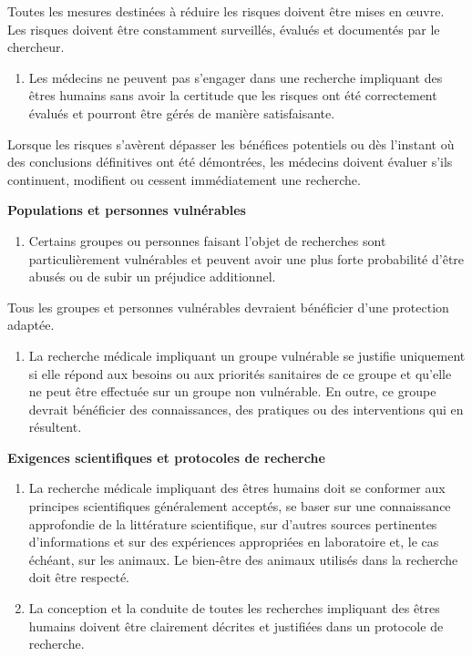 \documentclass[
  12pt,
]{book}
\providecommand{\tightlist}{%
  \setlength{\itemsep}{0pt}\setlength{\parskip}{0pt}}
\begin{document}
Toutes les mesures destinées à réduire les risques doivent être mises en œuvre. Les risques doivent être constamment surveillés, évalués et documentés par le chercheur.

\begin{enumerate}
\def\labelenumi{\arabic{enumi}.}
\setcounter{enumi}{17}
\tightlist
\item
  Les médecins ne peuvent pas s'engager dans une recherche impliquant des êtres humains sans avoir la certitude que les risques ont été correctement évalués et pourront être gérés de manière satisfaisante.
\end{enumerate}

Lorsque les risques s'avèrent dépasser les bénéfices potentiels ou dès l'instant où des conclusions définitives ont été démontrées, les médecins doivent évaluer s'ils continuent, modifient ou cessent immédiatement une recherche.

\textbf{Populations et personnes vulnérables}

\begin{enumerate}
\def\labelenumi{\arabic{enumi}.}
\setcounter{enumi}{18}
\tightlist
\item
  Certains groupes ou personnes faisant l'objet de recherches sont particulièrement vulnérables et peuvent avoir une plus forte probabilité d'être abusés ou de subir un préjudice additionnel.
\end{enumerate}

Tous les groupes et personnes vulnérables devraient bénéficier d'une protection adaptée.

\begin{enumerate}
\def\labelenumi{\arabic{enumi}.}
\setcounter{enumi}{19}
\tightlist
\item
  La recherche médicale impliquant un groupe vulnérable se justifie uniquement si elle répond aux besoins ou aux priorités sanitaires de ce groupe et qu'elle ne peut être effectuée sur un groupe non vulnérable. En outre, ce groupe devrait bénéficier des connaissances, des pratiques ou des interventions qui en résultent.
\end{enumerate}

\textbf{Exigences scientifiques et protocoles de recherche}

\begin{enumerate}
\def\labelenumi{\arabic{enumi}.}
\setcounter{enumi}{20}
\item
  La recherche médicale impliquant des êtres humains doit se conformer aux principes scientifiques généralement acceptés, se baser sur une connaissance approfondie de la littérature scientifique, sur d'autres sources pertinentes d'informations et sur des expériences appropriées en laboratoire et, le cas échéant, sur les animaux. Le bien-être des animaux utilisés dans la recherche doit être respecté.
\item
  La conception et la conduite de toutes les recherches impliquant des êtres humains doivent être clairement décrites et justifiées dans un protocole de recherche.
\end{enumerate}
\end{document}
